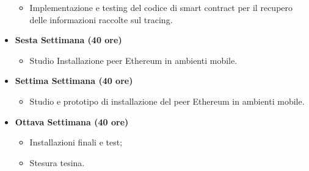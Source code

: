 \begin{itemize}
\begin{itemize}
	    \item Implementazione e testing del codice di smart contract per il recupero delle informazioni raccolte sul tracing.
        \end{itemize}
        \item \textbf{Sesta Settimana (40 ore)} 
        \begin{itemize}
            \item Studio Installazione peer Ethereum in ambienti mobile.
        \end{itemize}
        \item \textbf{Settima Settimana (40 ore)} 
        \begin{itemize}
            \item Studio e prototipo di installazione del peer Ethereum in ambienti mobile.
        \end{itemize}
        \item \textbf{Ottava Settimana (40 ore)} 
        \begin{itemize}
            \item Installazioni finali e test;
	    \item Stesura tesina.
        \end{itemize}
    \end{itemize}